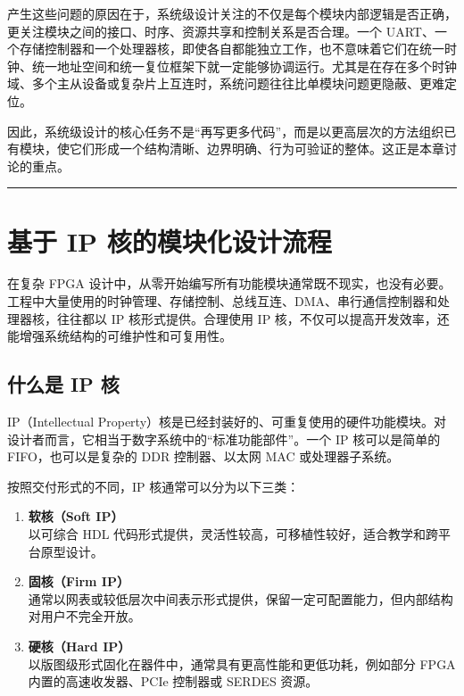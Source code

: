产生这些问题的原因在于，系统级设计关注的不仅是每个模块内部逻辑是否正确，更关注模块之间的接口、时序、资源共享和控制关系是否合理。一个
UART、一个存储控制器和一个处理器核，即使各自都能独立工作，也不意味着它们在统一时钟、统一地址空间和统一复位框架下就一定能够协调运行。尤其是在存在多个时钟域、多个主从设备或复杂片上互连时，系统问题往往比单模块问题更隐蔽、更难定位。

因此，系统级设计的核心任务不是``再写更多代码''，而是以更高层次的方法组织已有模块，使它们形成一个结构清晰、边界明确、行为可验证的整体。这正是本章讨论的重点。

\begin{center}\rule{0.5\linewidth}{0.5pt}\end{center}

\section{基于 IP
核的模块化设计流程}\label{ux57faux4e8e-ip-ux6838ux7684ux6a21ux5757ux5316ux8bbeux8ba1ux6d41ux7a0b}

在复杂 FPGA
设计中，从零开始编写所有功能模块通常既不现实，也没有必要。工程中大量使用的时钟管理、存储控制、总线互连、DMA、串行通信控制器和处理器核，往往都以
IP 核形式提供。合理使用 IP
核，不仅可以提高开发效率，还能增强系统结构的可维护性和可复用性。

\subsection{什么是 IP 核}\label{ux4ec0ux4e48ux662f-ip-ux6838}

IP（Intellectual
Property）核是已经封装好的、可重复使用的硬件功能模块。对设计者而言，它相当于数字系统中的``标准功能部件''。一个
IP 核可以是简单的 FIFO，也可以是复杂的 DDR 控制器、以太网 MAC
或处理器子系统。

按照交付形式的不同，IP 核通常可以分为以下三类：

\begin{enumerate}
\def\labelenumi{\arabic{enumi}.}
\item
  \textbf{软核（Soft IP）}\\
  以可综合 HDL
  代码形式提供，灵活性较高，可移植性较好，适合教学和跨平台原型设计。
\item
  \textbf{固核（Firm IP）}\\
  通常以网表或较低层次中间表示形式提供，保留一定可配置能力，但内部结构对用户不完全开放。
\item
  \textbf{硬核（Hard IP）}\\
  以版图级形式固化在器件中，通常具有更高性能和更低功耗，例如部分 FPGA
  内置的高速收发器、PCIe 控制器或 SERDES 资源。
\end{enumerate}

